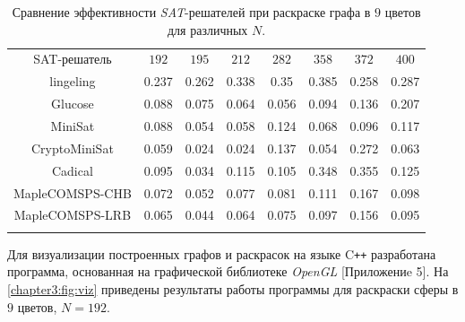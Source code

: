 \begin{table}[h]
\centering
\captionsetup{justification=centering}
\caption{Сравнение эффективности \textit{SAT}-решателей при раскраске графа в $9$ цветов для различных $N$.}
\label{chapter3:tab:color9}
\begin{tabular}{@{}|c|c|c|c|c|c|c|c|}
\Xhline{4\arrayrulewidth}
SAT-решатель          & $192$ & $195$ & $212$ & $282$ & $358$ & $372$ & $400$ \\ \Xhline{4\arrayrulewidth}
lingeling             & 0.237 & 0.262 & 0.338 & 0.35  & 0.385 & 0.258 & 0.287 \\ \hline
Glucose               & 0.088 & 0.075 & 0.064 & 0.056 & 0.094 & 0.136 & 0.207 \\ \hline
MiniSat               & 0.088 & 0.054 & 0.058 & 0.124 & 0.068 & 0.096 & 0.117 \\ \hline
CryptoMiniSat         & 0.059 & 0.024 & 0.024 & 0.137 & 0.054 & 0.272 & 0.063 \\ \hline
Cadical               & 0.095 & 0.034 & 0.115 & 0.105 & 0.348 & 0.355 & 0.125 \\ \hline
MapleCOMSPS-CHB       & 0.072 & 0.052 & 0.077 & 0.081 & 0.111 & 0.167 & 0.098 \\ \hline
MapleCOMSPS-LRB       & 0.065 & 0.044 & 0.064 & 0.075 & 0.097 & 0.156 & 0.095 \\ \Xhline{4\arrayrulewidth}
\end{tabular}
\end{table}

Для визуализации построенных графов и раскрасок на языке C\texttt{++} разработана программа, 
основанная на графической библиотеке \textit{OpenGL} [Приложениe 5]. 
На \figurename{ \ref{chapter3:fig:viz}} приведены результаты работы программы для раскраски сферы в $9$ цветов, $N=192$.

